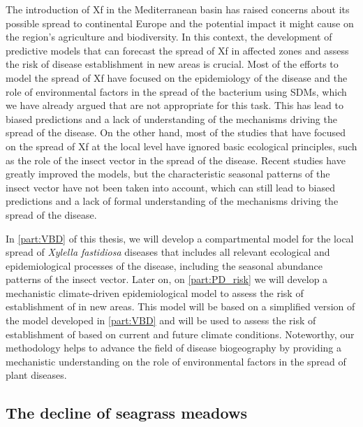 The introduction of Xf in the Mediterranean basin has raised concerns about its
possible spread to continental Europe and the potential impact it might cause
on the region's agriculture and biodiversity. In this context, the development
of predictive models that can forecast the spread of Xf in affected zones and
assess the risk of disease establishment in new areas is crucial. Most of the
efforts to model the spread of Xf have focused on the epidemiology of the
disease and the role of environmental factors in the spread of the bacterium
using SDMs, which we have already argued that are not appropriate for this
task. This has lead to biased predictions and a lack of understanding of the
mechanisms driving the spread of the disease. On the other hand, most of the
studies that have focused on the spread of Xf at the local level have ignored
basic ecological principles, such as the role of the insect vector in the
spread of the disease. Recent studies have greatly improved the models, but the
characteristic seasonal patterns of the insect vector have not been taken into
account, which can still lead to biased predictions and a lack of formal
understanding of the mechanisms driving the spread of the disease.

In \cref{part:VBD} of this thesis, we will develop a compartmental model for
the local spread of \textit{Xylella fastidiosa} diseases that includes all
relevant ecological and epidemiological processes of the disease, including
the seasonal abundance patterns of the insect vector. Later on, on
\cref{part:PD_risk} we will develop a mechanistic climate-driven
epidemiological model to assess the risk of establishment of \xf{} in new
areas. This model will be based on a simplified version of the model developed
in \cref{part:VBD} and will be used to assess the risk of establishment of
\xf{} based on current and future climate conditions. Noteworthy, our
methodology helps to advance the field of disease biogeography by providing a
mechanistic understanding on the role of environmental factors in the spread of
plant diseases.

\subsection{\label{sec:The decline of seagrass meadows} The decline of seagrass
  meadows}


